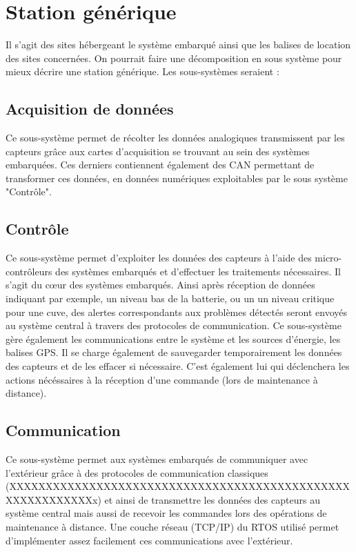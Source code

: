 \section{Station générique}
    Il s'agit des sites hébergeant le système embarqué ainsi que les balises de location des sites concernées. On pourrait faire une décomposition en sous système pour mieux décrire une station générique. Les sous-systèmes seraient :

       \subsection{Acquisition de données}
       Ce sous-système permet de récolter les données analogiques transmissent par les capteurs grâce aux cartes d'acquisition se trouvant au sein des systèmes embarquées. Ces derniers contiennent également des CAN permettant de transformer ces données, en données numériques exploitables par le sous système "Contrôle".

       \subsection{Contrôle}
       Ce sous-système permet d'exploiter les données des capteurs à l'aide des micro-contrôleurs des systèmes embarqués et d'effectuer les traitements nécessaires. Il s'agit du cœur des systèmes embarqués. Ainsi après réception de données indiquant par exemple, un niveau bas de la batterie, ou un un niveau critique pour une cuve, des alertes correspondants aux problèmes détectés seront envoyés au système central à travers des protocoles de communication.
       Ce sous-système gère également les communications entre le système et les sources d'énergie, les balises GPS. Il se charge également de sauvegarder temporairement les données des capteurs et de les effacer si nécessaire. C'est également lui qui déclenchera les actions nécéssaires à la réception d'une commande (lors de maintenance à distance).

       \subsection{Communication}
       Ce sous-système permet aux systèmes embarqués de communiquer avec l'extérieur grâce à des protocoles de communication classiques (XXXXXXXXXXXXXXXXXXXXXXXXXXXXXXXXXXXXXXXXXXXXXXXXXXXXXXXXXXXx) et ainsi de transmettre les données des capteurs au système central mais aussi de recevoir les commandes lors des opérations de maintenance à distance. Une couche réseau (TCP/IP) du RTOS utilisé permet d'implémenter assez facilement ces communications avec l'extérieur.